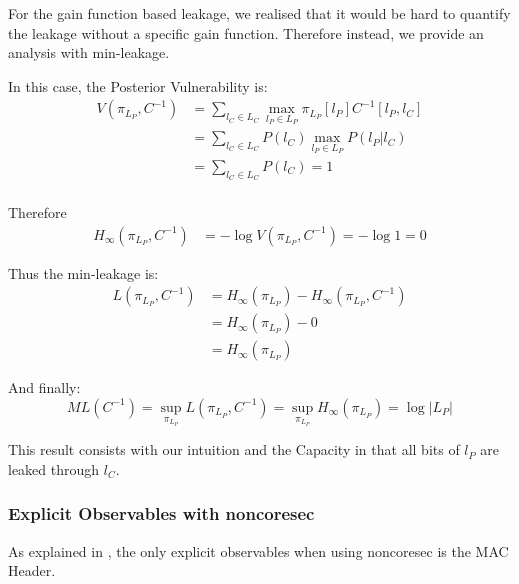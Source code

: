 For the gain function based leakage\cite{GLeakage}, we realised that it would be hard to quantify the leakage without a specific gain function. Therefore instead, we provide an analysis with min-leakage.

In this case, the Posterior Vulnerability is:
\begin{equation}
	\begin{aligned}
		V(\pi_{L_P}, C^{-1}) 
		&= \sum_{l_{C} \in L_{C}} \max_{l_{P} \in L_{P}} \pi_{L_P}[l_P]C^{-1}[l_P,l_C] \\
		&=  \sum_{l_{C} \in L_{C}} P(l_C) \max_{l_{P} \in L_{P}} P(l_P | l_C) \\
	      &= \sum_{l_{C} \in L_{C}} P(l_C) = 1 \\
	\end{aligned}
\end{equation}

Therefore
\begin{equation}
	\begin{aligned}
		H_{\infty}(\pi_{L_{P}}, C^{-1})
		 &= - \log{V(\pi_{L_{P}}, C^{-1})} = - \log1= 0
	\end{aligned}
\end{equation}

Thus the min-leakage is:
\begin{equation}
	\begin{aligned}
	L(\pi_{L_P}, C^{-1}) 
	 &= H_{\infty}(\pi_{L_P}) - H_{\infty}(\pi_{L_{P}}, C^{-1}) \\
	 &= H_{\infty}(\pi_{L_P}) - 0 \\
	 &= H_{\infty}(\pi_{L_P})
	\end{aligned}
\end{equation}

And finally:
\begin{equation}
	ML(C^{-1}) = \sup_{\pi_{L_P}}{L(\pi_{L_P},C^{-1})} =  \sup_{\pi_{L_P}} H_{\infty}(\pi_{L_P}) = \log{|L_P|}
\end{equation}

This result consists with our intuition and the Capacity in  that all bits of $l_P$ are leaked through $l_C$.

\subsubsection{Explicit Observables with noncoresec}

As explained in , the only explicit observables when using noncoresec is the MAC Header. 

